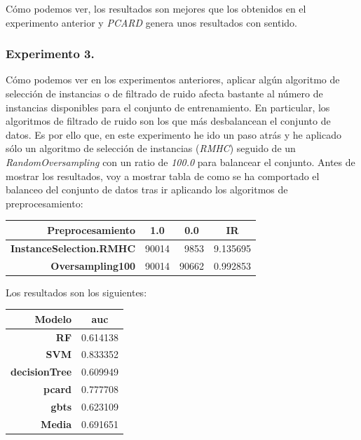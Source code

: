 \documentclass[11pt]{article}
\begin{document}
Cómo podemos ver, los resultados son mejores que los obtenidos en el experimento anterior y \textit{PCARD} genera unos resultados con sentido.

\subsubsection{Experimento 3.}

Cómo podemos ver en los experimentos anteriores, aplicar algún algoritmo de selección de instancias o de filtrado de ruido afecta bastante al número de instancias disponibles para el conjunto de entrenamiento. En particular, los algoritmos de filtrado de ruido son los que más desbalancean el conjunto de datos. Es por ello que, en este experimento he ido un paso atrás y he aplicado sólo un algoritmo de selección de instancias (\textit{RMHC}) seguido de un \textit{RandomOversampling} con un ratio de \textit{100.0} para balancear el conjunto. Antes de mostrar los resultados, voy a mostrar tabla de como se ha comportado el balanceo del conjunto de datos tras ir aplicando los algoritmos de preprocesamiento: 

\begin{table}[H]
	\centering
	\begin{tabular}{rrrr}
		\textbf{Preprocesamiento} & \multicolumn{1}{c}{\textbf{1.0}} & \multicolumn{1}{c}{\textbf{0.0}} & \multicolumn{1}{c}{\textbf{IR}} \\ \hline
		\textbf{InstanceSelection.RMHC} & 90014 & 9853 & 9.135695 \\
		\textbf{Oversampling100} & 90014 & 90662 & 0.992853
	\end{tabular}
\end{table}

Los resultados son los siguientes:

\begin{table}[H]
	\centering
	\begin{tabular}{rr}
		\textbf{Modelo} & \multicolumn{1}{c}{\textbf{auc}} \\ \hline
		\textbf{RF} & 0.614138 \\
		\textbf{SVM} & 0.833352 \\
		\textbf{decisionTree} & 0.609949 \\
		\textbf{pcard} & 0.777708 \\
		\textbf{gbts} & 0.623109 \\ \hline
		\textbf{Media} & 0.691651
	\end{tabular}
\end{table}
\end{document}
